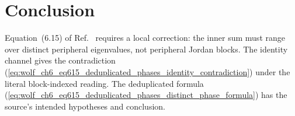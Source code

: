 \documentclass{article}
\begin{document}
\section{Conclusion}

Equation~(6.15) of Ref.~\cite{Wolf2012Quantum} requires a local correction:
the inner sum must range over distinct peripheral eigenvalues, not peripheral
Jordan blocks. The identity channel gives the contradiction
(\ref{eq:wolf_ch6_eq615_deduplicated_phases_identity_contradiction}) under
the literal block-indexed reading. The deduplicated formula
(\ref{eq:wolf_ch6_eq615_deduplicated_phases_distinct_phase_formula}) has the
source's intended hypotheses and conclusion.



\end{document}
